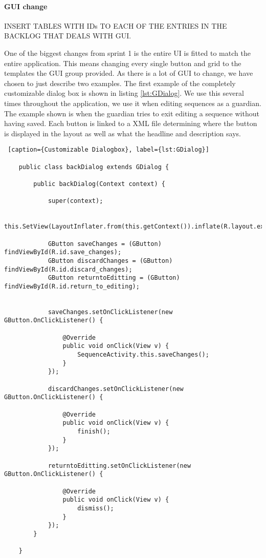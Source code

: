 \paragraph{GUI change} \label{para:spr2_resolved_issues_GUI_change}


INSERT TABLES WITH IDs TO EACH OF THE ENTRIES IN THE  BACKLOG THAT DEALS WITH GUI. 

One of the biggest changes from sprint 1 is the entire UI is fitted to match the entire application. This means changing every single button and grid to the templates the GUI group provided. As there is a lot of GUI to change, we have chosen to just describe two examples. The first example of the completely customizable dialog box is shown in listing \ref{lst:GDialog}. We use this several times throughout the application, we use it when editing sequences as a guardian. The example shown is when the guardian tries to exit editing a sequence without having saved. Each button is linked to a XML file determining where the button is displayed in the layout as well as what the headline and description says.

\begin{lstlisting} [caption={Customizable Dialogbox}, label={lst:GDialog}]

    public class backDialog extends GDialog {

        public backDialog(Context context) {

            super(context);

            this.SetView(LayoutInflater.from(this.getContext()).inflate(R.layout.exit_sequence_dialog,null));

            GButton saveChanges = (GButton) findViewById(R.id.save_changes);
            GButton discardChanges = (GButton) findViewById(R.id.discard_changes);
            GButton returntoEditting = (GButton) findViewById(R.id.return_to_editing);


            saveChanges.setOnClickListener(new GButton.OnClickListener() {

                @Override
                public void onClick(View v) {
                    SequenceActivity.this.saveChanges();
                }
            });

            discardChanges.setOnClickListener(new GButton.OnClickListener() {

                @Override
                public void onClick(View v) {
                    finish();
                }
            });

            returntoEditting.setOnClickListener(new GButton.OnClickListener() {

                @Override
                public void onClick(View v) {
                    dismiss();
                }
            });
        }

    }
\end{lstlisting}

